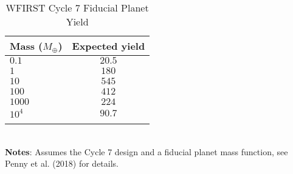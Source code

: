 \documentclass{article}
\begin{document}
\begin{table}
  \caption{WFIRST Cycle 7 Fiducial Planet Yield}
\vspace{12pt}
  \begin{tabular}{lc}
{\bf Mass ($M_{\oplus}$)} & {\bf Expected yield}\\
\hline
$0.1$ & $  20.5$ \\
$1$ & $   180$ \\
$10$ & $   545$ \\
$100$ & $   412$ \\
$1000$ & $   224$ \\
$10^4$ & $  90.7$ \\
\hline
\vspace{12pt}
\end{tabular}
\\{\bf Notes}: Assumes the Cycle 7 design and a fiducial planet mass function, see Penny et al. (2018) for details.
\label{wfirstyield}
\end{table}
\end{document}
